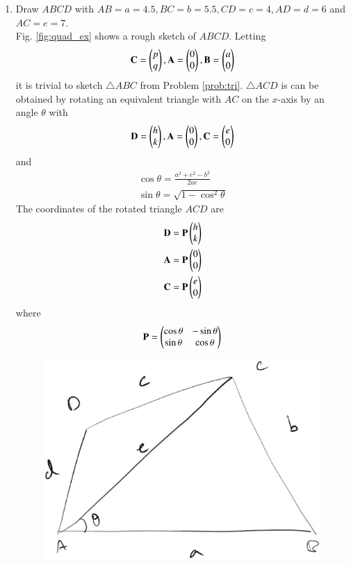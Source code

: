 \renewcommand{\theequation}{\theenumi}
\begin{enumerate}[label=\arabic*.,ref=\thesubsection.\theenumi]

\item Draw $ABCD$ with $AB=a=4.5, BC  =b=5.5, CD =c= 4, AD =d=6$ and $AC=e = 7$.
\\
\solution Fig. \ref{fig:quad_ex} shows a rough sketch of $ABCD$. Letting
\begin{align}
\label{eq:tri_basic_new}
\mathbf{C} = \begin{pmatrix}p\\q\end{pmatrix}, \mathbf{A} = \begin{pmatrix}0\\0\end{pmatrix}, \mathbf{B} = \begin{pmatrix}a\\0\end{pmatrix}
\end{align}
%
it is trivial to sketch $\triangle ABC$ from  Problem \ref{prob:tri}.
%
$\triangle ACD$ is can be obtained by rotating an equivalent triangle with $AC$ on
the $x$-axis by an angle $\theta$ with
\begin{align}
\label{eq:tri_basic_rot}
\mathbf{D} = \begin{pmatrix}h\\k\end{pmatrix}, \mathbf{A} = \begin{pmatrix}0\\0\end{pmatrix}, \mathbf{C} = \begin{pmatrix}e\\0\end{pmatrix}
\end{align}
%
and
\begin{align}
\label{eq:tri_rot_ang}
\cos \theta = \frac{a^2+e^2-b^2}{2ae}
\\
\sin \theta = \sqrt{1-\cos^2\theta}
\end{align}
%
The coordinates of the rotated triangle $ACD$ are
\begin{align}
\label{eq:tri_rot_trans}
\mathbf{D} = \mathbf{P}\begin{pmatrix}h\\k\end{pmatrix}
\\
\mathbf{A} = \mathbf{P}\begin{pmatrix}0\\0\end{pmatrix}
\\
\mathbf{C} = \mathbf{P}\begin{pmatrix}e\\0\end{pmatrix}
\end{align}
%
where 
\begin{align}
\label{eq:tri_rot_mat}
\mathbf{P} = \begin{pmatrix}\cos\theta & -\sin \theta\\ \sin \theta & \cos \theta\end{pmatrix}
\end{align}
\begin{figure}[!ht]
\includegraphics[width=\columnwidth]{./constructions/figs/quad_ex.eps}

\end{figure}
\end{enumerate}
